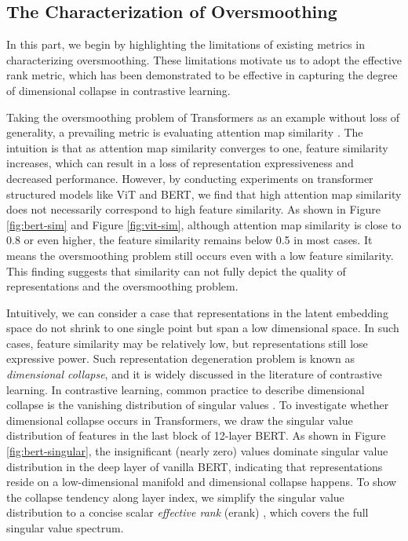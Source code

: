 \documentclass{article}
\theoremstyle{definition}
\theoremstyle{remark}
\theoremstyle{theorem}
\begin{document}
\subsection{The Characterization of Oversmoothing}

In this part, we begin by highlighting the limitations of existing metrics in characterizing oversmoothing. These limitations motivate us to adopt the effective rank metric, which has been demonstrated to be effective in capturing the degree of dimensional collapse in contrastive learning. 

Taking the oversmoothing problem of Transformers as an example without loss of generality, a prevailing metric is evaluating attention map similarity \citep{wang2022anti, gong2021vision, shi2022revisiting}. The intuition is that as attention map similarity converges to one, feature similarity increases, which can result in a loss of representation expressiveness and decreased performance. However, by conducting experiments on transformer structured models like ViT and BERT, we find that high attention map similarity does not necessarily correspond to high feature similarity. As shown in Figure \ref{fig:bert-sim} and Figure \ref{fig:vit-sim}, although attention map similarity is close to 0.8 or even higher, the feature similarity remains below 0.5 in most cases. It means the oversmoothing problem still occurs even with a low feature similarity. This finding suggests that similarity can not fully depict the quality of representations and the oversmoothing problem. 

Intuitively, we can consider a case that representations in the latent embedding space do not shrink to one single point but span a low dimensional space. In such cases, feature similarity may be relatively low, but representations still lose expressive power. Such representation degeneration problem is known as \textit{dimensional collapse}, and it is 
widely discussed in the literature of contrastive learning. In contrastive learning, common practice to describe dimensional collapse is the vanishing distribution of singular values \citep{gao2019representation,ethayarajh2019contextual, jing2021understanding}. To investigate whether dimensional collapse occurs in Transformers, we draw the singular value distribution of features in the last block of 12-layer BERT. As shown in Figure \ref{fig:bert-singular}, the insignificant (nearly zero) values dominate singular value distribution in the deep layer of vanilla BERT, indicating that representations reside on a low-dimensional manifold and dimensional collapse happens. To show the collapse tendency along layer index, we simplify the singular value distribution to a concise scalar \textit{effective rank} (erank) \citep{roy2007effective}, which covers the full singular value spectrum. 
\end{document}

